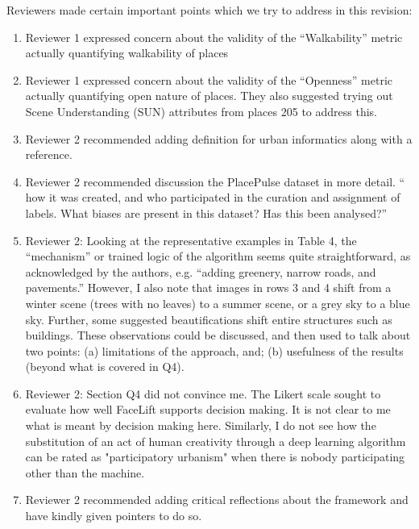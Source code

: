 \documentclass{paper}
\newenvironment{myquote}
{\definecolor{shadecolor}{rgb}{0.9,0.95,1} \begin{shaded*} \sf \em}
{\em\end{shaded*}}
\begin{document}
\begin{myquote}

\noindent Reviewers made certain important points which we try to address in this revision:

\begin{enumerate}
\item Reviewer 1 expressed concern about the validity of the ``Walkability'' metric actually quantifying walkability of places
\item Reviewer 1 expressed concern about the validity of the ``Openness'' metric actually quantifying open nature of places. They also suggested trying out Scene Understanding (SUN) attributes from places 205 to address this. 
\item Reviewer 2 recommended adding definition for urban informatics along with a reference.
\item Reviewer 2 recommended discussion the PlacePulse dataset in more detail. `` how it was created, and who participated in the curation and assignment of labels. What biases are present in this dataset? Has this been analysed?''
\item Reviewer 2: Looking at the representative examples in Table 4, the ``mechanism'' or trained logic of the algorithm seems quite straightforward, as acknowledged by the authors, e.g. ``adding greenery, narrow roads, and pavements.'' However, I also note that images in rows 3 and 4 shift from a winter scene (trees with no leaves) to a summer scene, or a grey sky to a blue sky. Further, some suggested beautifications shift entire structures such as buildings. These observations could be discussed, and then used to talk about two points: (a) limitations of the approach, and; (b) usefulness of the results (beyond what is covered in Q4). 
\item Reviewer 2: Section Q4 did not convince me. The Likert scale sought to evaluate how well FaceLift supports decision making. It is not clear to me what is meant by decision making here. Similarly, I do not see how the substitution of an act of human creativity through a deep learning algorithm can be rated as "participatory urbanism" when there is nobody participating other than the machine. 
\item Reviewer 2 recommended adding critical reflections about the framework and have kindly given pointers to do so.
\end{enumerate}

\end{myquote}
\end{document}
